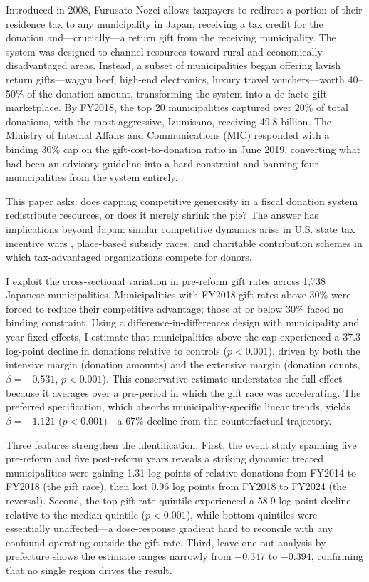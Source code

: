 \documentclass[12pt]{article}
\newcommand{\textyen}{\text{\yen}}
\begin{document}
Introduced in 2008, Furusato Nozei allows taxpayers to redirect a portion of their residence tax to any municipality in Japan, receiving a tax credit for the donation and---crucially---a return gift from the receiving municipality. The system was designed to channel resources toward rural and economically disadvantaged areas. Instead, a subset of municipalities began offering lavish return gifts---wagyu beef, high-end electronics, luxury travel vouchers---worth 40--50\% of the donation amount, transforming the system into a de facto gift marketplace. By FY2018, the top 20 municipalities captured over 20\% of total donations, with the most aggressive, Izumisano, receiving \textyen 49.8 billion. The Ministry of Internal Affairs and Communications (MIC) responded with a binding 30\% cap on the gift-cost-to-donation ratio in June 2019, converting what had been an advisory guideline into a hard constraint and banning four municipalities from the system entirely.

This paper asks: does capping competitive generosity in a fiscal donation system redistribute resources, or does it merely shrink the pie? The answer has implications beyond Japan: similar competitive dynamics arise in U.S. state tax incentive wars \citep{wilson1999theories}, place-based subsidy races, and charitable contribution schemes in which tax-advantaged organizations compete for donors.

I exploit the cross-sectional variation in pre-reform gift rates across 1,738 Japanese municipalities. Municipalities with FY2018 gift rates above 30\% were forced to reduce their competitive advantage; those at or below 30\% faced no binding constraint. Using a difference-in-differences design with municipality and year fixed effects, I estimate that municipalities above the cap experienced a 37.3 log-point decline in donations relative to controls ($p < 0.001$), driven by both the intensive margin (donation amounts) and the extensive margin (donation counts, $\hat{\beta} = -0.531$, $p < 0.001$). This conservative estimate understates the full effect because it averages over a pre-period in which the gift race was accelerating. The preferred specification, which absorbs municipality-specific linear trends, yields $\hat{\beta} = -1.121$ ($p < 0.001$)---a 67\% decline from the counterfactual trajectory.

Three features strengthen the identification. First, the event study spanning five pre-reform and five post-reform years reveals a striking dynamic: treated municipalities were gaining 1.31 log points of relative donations from FY2014 to FY2018 (the gift race), then lost 0.96 log points from FY2018 to FY2024 (the reversal). Second, the top gift-rate quintile experienced a 58.9 log-point decline relative to the median quintile ($p < 0.001$), while bottom quintiles were essentially unaffected---a dose-response gradient hard to reconcile with any confound operating outside the gift rate. Third, leave-one-out analysis by prefecture shows the estimate ranges narrowly from $-0.347$ to $-0.394$, confirming that no single region drives the result.
\end{document}
